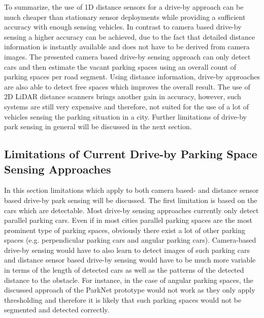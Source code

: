 To summarize, the use of 1D distance sensors for a drive-by approach can be much cheaper than stationary sensor deployments while providing a sufficient accuracy with enough sensing vehicles. In contrast to camera based drive-by sensing a higher accuracy can be achieved, due to the fact that detailed distance information is  instantly available and does not have to be derived from camera images. The presented camera based drive-by sensing approach can only detect cars and then estimate the vacant parking spaces using an overall count of parking spaces per road segment. Using distance information, drive-by approaches are also able to detect free spaces which improves the overall result. The use of 2D LiDAR distance scanners brings another gain in accuracy, however, such systems are still very expensive and therefore, not suited for the use of a lot of vehicles sensing the parking situation in a city. Further limitations of drive-by park sensing in general will be discussed in the next section.


\subsection{Limitations of Current Drive-by Parking Space Sensing Approaches}
\label{sec:limitations_driveby_sensing}

In this section limitations which apply to both camera based- and distance sensor based drive-by park sensing will be discussed. The first limitation is based on the cars which are detectable. Most drive-by sensing approaches currently only detect parallel parking cars. Even if in most cities parallel parking spaces are the most prominent type of parking spaces, obviously there exist a lot of other parking spaces (e.g. perpendicular parking cars and angular parking cars). Camera-based drive-by sensing would have to also learn to detect images of such parking cars and distance sensor based drive-by sensing would have to be much more variable in terms of the length of detected cars as well as the patterns of the detected distance to the obstacle. For instance, in the case of angular parking spaces, the discussed approach of the ParkNet prototype would not work as they only apply thresholding and therefore it is likely that such parking spaces would not be segmented and detected correctly.

